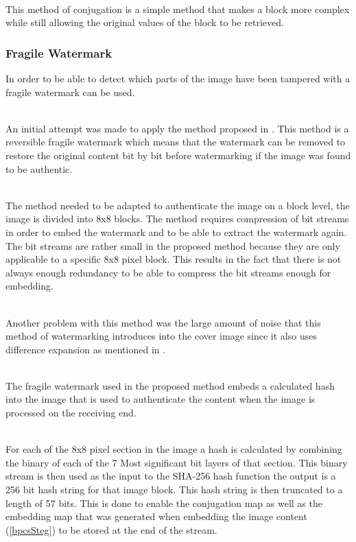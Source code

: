 \documentclass[12pt]{article}
\begin{document}
\hspace{0pt} \\
This method of conjugation is a simple method that makes a block more complex while still allowing the original values of the block to be retrieved.



\subsubsection{Fragile Watermark}
\label{impFragileWatermark}
In order to be able to detect which parts of the image have been tampered with a fragile watermark can be used.

\hspace{0pt} \\
An initial attempt was made to apply the method proposed in \cite{tian2002wavelet}.
This method is a reversible fragile watermark which means that the watermark can be removed to restore the original content bit by bit before watermarking if the image was found to be authentic.

\hspace{0pt} \\
The method needed to be adapted to authenticate the image on a block level, the image is divided into 8x8 blocks.
The method requires compression of bit streams in order to embed the watermark and to be able to extract the watermark again.
The bit streams are rather small in the proposed method because they are only applicable to a specific 8x8 pixel block. This results in the fact that there is not always enough redundancy to be able to compress the bit streams enough for embedding.

\hspace{0pt} \\
Another problem with this method was the large amount of noise that this method of watermarking introduces into the cover image since it also uses difference expansion as mentioned in \cite{tian2002reversible}.

\hspace{0pt} \\
The fragile watermark used in the proposed method embeds a calculated hash into the image that is used to authenticate the content when the image is processed on the receiving end.

\hspace{0pt} \\
For each of the 8x8 pixel section in the image a hash is calculated by combining the binary of each of the 7 Most significant bit layers of that section. This binary stream is then used as the input to the SHA-256 hash function the output is a 256 bit hash string for that image block.
This hash string is then truncated to a length of 57 bits.
This is done to enable the conjugation map as well as the embedding map that was generated when embedding the image content (\ref{bpcsSteg}) to be stored at the end of the stream.
\end{document}
